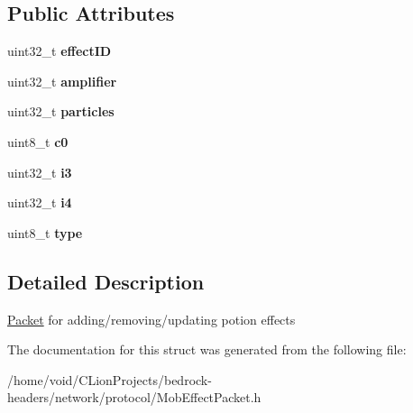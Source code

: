\subsection*{Public Attributes}
\begin{DoxyCompactItemize}
\item 
\mbox{\label{struct_mob_effect_packet_a3223d8f9b8a61ce4e23ad5a5d52814b6}} 
uint32\+\_\+t {\bfseries effect\+ID}
\item 
\mbox{\label{struct_mob_effect_packet_a8ca9f34e668ef528e21a07b22548a2f8}} 
uint32\+\_\+t {\bfseries amplifier}
\item 
\mbox{\label{struct_mob_effect_packet_a8b4dc524d5c9211d8aaac8744f84aaae}} 
uint32\+\_\+t {\bfseries particles}
\item 
\mbox{\label{struct_mob_effect_packet_ad071cbfddd00c63a34e76d92cd0d17da}} 
uint8\+\_\+t {\bfseries c0}
\item 
\mbox{\label{struct_mob_effect_packet_a09991ceb8bf6a297b48580d17795cc48}} 
uint32\+\_\+t {\bfseries i3}
\item 
\mbox{\label{struct_mob_effect_packet_a3592abdd831dc432594a6879a2053f0c}} 
uint32\+\_\+t {\bfseries i4}
\item 
\mbox{\label{struct_mob_effect_packet_a018fe02df46217e8f877c5402558af88}} 
uint8\+\_\+t {\bfseries type}
\end{DoxyCompactItemize}


\subsection{Detailed Description}
\mbox{\hyperlink{struct_packet}{Packet}} for adding/removing/updating potion effects 

The documentation for this struct was generated from the following file\+:\begin{DoxyCompactItemize}
\item 
/home/void/\+C\+Lion\+Projects/bedrock-\/headers/network/protocol/Mob\+Effect\+Packet.\+h\end{DoxyCompactItemize}
